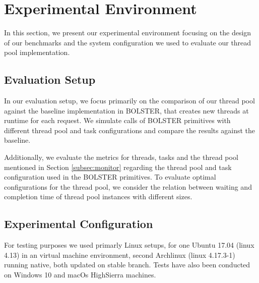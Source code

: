 \documentclass[conference]{IEEEtran}
\begin{document}
\section{Experimental Environment}
In this section, we present our experimental environment focusing on the design of our benchmarks and the system configuration we used to evaluate our thread pool implementation.

\subsection{Evaluation Setup}
In our evaluation setup, we focus primarily on the comparison of our thread pool against the baseline implementation in BOLSTER, that creates new threads at runtime for each request. We simulate calls of BOLSTER primitives with different thread pool and task configurations and compare the results against the baseline.

Additionally, we evaluate the metrics for threads, tasks and the thread pool mentioned in Section \ref{subsec:monitor} regarding the thread pool and task configuration used in the BOLSTER primitives. To evaluate optimal configurations for the thread pool, we consider the relation between waiting and completion time of  thread pool instances with different sizes.


\subsection{Experimental Configuration}

For testing purposes we used primarly Linux setups, for one Ubuntu 17.04
(linux 4.13) in an virtual machine environment, second Archlinux (linux
4.17.3-1) running native, both updated on stable branch. Tests have also been
conducted on Windows 10 and macOs HighSierra machines.
\end{document}
